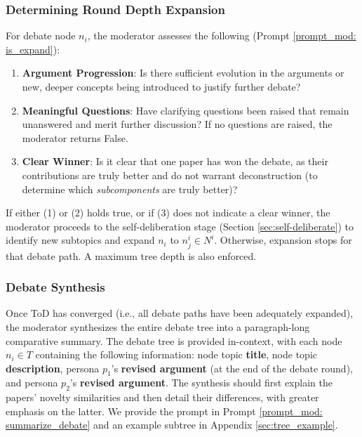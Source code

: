 \subsubsection{\textbf{Determining Round Depth Expansion}}
\par For debate node $n_i$, the moderator assesses the following (Prompt \ref{prompt_mod: is_expand}):
\begin{enumerate}[leftmargin=*]
    \item \textbf{Argument Progression}: Is there sufficient evolution in the arguments or new, deeper concepts being introduced to justify further debate?
    \item \textbf{Meaningful Questions}: Have clarifying questions been raised that remain unanswered and merit further discussion? If no questions are raised, the moderator returns False.
    \item \textbf{Clear Winner}: Is it clear that one paper has won the debate, as their contributions are truly better and do not warrant deconstruction (to determine which \textit{subcomponents} are truly better)?
\end{enumerate}
If either (1) or (2) holds true, or if (3) does not indicate a clear winner, the moderator proceeds to the self-deliberation stage (Section \ref{sec:self-deliberate}) to identify new subtopics and expand $n_i$ to $n^i_j \in N^i$. Otherwise, expansion stops for that debate path. A maximum tree depth is also enforced.

\subsubsection{\textbf{Debate Synthesis}}
\par Once ToD has converged (i.e., all debate paths have been adequately expanded), the moderator synthesizes the entire debate tree into a paragraph-long comparative summary. The debate tree is provided in-context, with each node $n_i \in T$ containing the following information: node topic \textbf{title}, node topic \textbf{description}, persona $p_1$'s \textbf{revised argument} (at the end of the debate round), and persona $p_2$'s \textbf{revised argument}. The synthesis should first explain the papers' novelty similarities and then detail their differences, with greater emphasis on the latter. We provide the prompt in Prompt \ref{prompt_mod: summarize_debate} and an example subtree in Appendix \ref{sec:tree_example}.